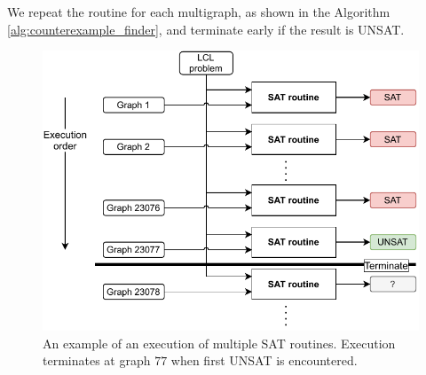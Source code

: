 We repeat the routine for each multigraph, as shown in the Algorithm \ref{alg:counterexample_finder}, and terminate early if the result is UNSAT.

\begin{figure}[H]
\centering
\includegraphics[]{diagrams/implementation_idea_diagram3.pdf}
\caption{An example of an execution of multiple SAT routines. Execution terminates at graph $77$ when first UNSAT is encountered.}
\label{fig:implementation:2}
\end{figure}



